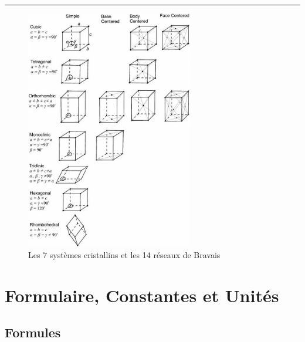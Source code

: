 \documentclass{article}
\begin{document}
\vspace{8mm}
\hrule
\vspace{3mm}
\begin{figure}[H]
    \centering
    \includegraphics[width=0.65\textwidth]{Fig/bravais.jpg}
    \caption{Les 7 systèmes cristallins et les 14 réseaux de Bravais}
    \label{fig:bravais}
\end{figure}


\section{Formulaire, Constantes et Unités}

\subsection{Formules}
\end{document}
